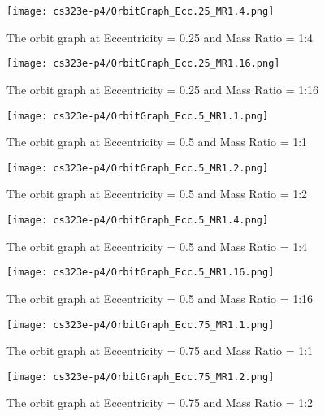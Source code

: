 \documentclass{article}
\begin{document}
\begin{figure}
    \centering
    \texttt{[image: cs323e-p4/OrbitGraph\_Ecc.25\_MR1.4.png]}
    \caption{The orbit graph at Eccentricity = 0.25 and Mass Ratio = 1:4}
    \label{fig:ecc.25_mr1.4}
\end{figure}

\begin{figure}
    \centering
    \texttt{[image: cs323e-p4/OrbitGraph\_Ecc.25\_MR1.16.png]}
    \caption{The orbit graph at Eccentricity = 0.25 and Mass Ratio = 1:16}
    \label{fig:ecc.25_mr1.16}
\end{figure}

\begin{figure}
    \centering
    \texttt{[image: cs323e-p4/OrbitGraph\_Ecc.5\_MR1.1.png]}
    \caption{The orbit graph at Eccentricity = 0.5 and Mass Ratio = 1:1}
    \label{fig:ecc.5_mr1.1}
\end{figure}

\begin{figure}
    \centering
    \texttt{[image: cs323e-p4/OrbitGraph\_Ecc.5\_MR1.2.png]}
    \caption{The orbit graph at Eccentricity = 0.5 and Mass Ratio = 1:2}
    \label{fig:ecc.5_mr1.2}
\end{figure}

\begin{figure}
    \centering
    \texttt{[image: cs323e-p4/OrbitGraph\_Ecc.5\_MR1.4.png]}
    \caption{The orbit graph at Eccentricity = 0.5 and Mass Ratio = 1:4}
    \label{fig:ecc.5_mr1.4}
\end{figure}

\begin{figure}
    \centering
    \texttt{[image: cs323e-p4/OrbitGraph\_Ecc.5\_MR1.16.png]}
    \caption{The orbit graph at Eccentricity = 0.5 and Mass Ratio = 1:16}
    \label{fig:ecc.5_mr1.16}
\end{figure}

\begin{figure}
    \centering
    \texttt{[image: cs323e-p4/OrbitGraph\_Ecc.75\_MR1.1.png]}
    \caption{The orbit graph at Eccentricity = 0.75 and Mass Ratio = 1:1}
    \label{fig:ecc.75_mr1.1}
\end{figure}

\begin{figure}
    \centering
    \texttt{[image: cs323e-p4/OrbitGraph\_Ecc.75\_MR1.2.png]}
    \caption{The orbit graph at Eccentricity = 0.75 and Mass Ratio = 1:2}
    \label{fig:ecc.75_mr1.2}
\end{figure}
\end{document}

